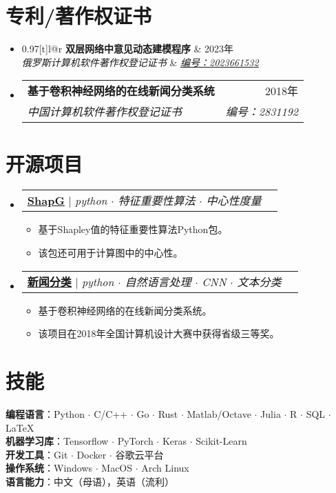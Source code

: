 \documentclass[letterpaper,10pt]{ctexart}
\makeatletter
\newcommand{\link}[2]{\href{#1}{\color{blue}\underline{#2}}}
\newcommand{\resumeItem}[1]{
  \item\small{
    {#1 \vspace{-2pt}}
  }
}
\newcommand{\resumeSubheading}[4]{
  \vspace{-2pt}\item
  \begin{tabular*}{0.97\textwidth}[t]{l@{\extracolsep{\fill}}r}
    \textbf{#1} & #2 \\
    \textit{\small#3} & \textit{\small #4} \\
  \end{tabular*}\vspace{-7pt}
}
\newcommand{\resumeProjectHeading}[2]{
  \item
  \begin{tabular*}{0.97\textwidth}{l@{\extracolsep{\fill}}r}
    \small#1 & #2 \\
  \end{tabular*}\vspace{-7pt}
}
\newenvironment{resumeSubHeadingList}{\begin{itemize}[leftmargin=0.15in, label={}]}{\end{itemize}}
\newenvironment{resumeItemList}{\begin{itemize}}{\end{itemize}}
\makeatother
\begin{document}
\newpage
\section{专利/著作权证书}
\begin{resumeSubHeadingList}
  \resumeSubheading
    {双层网络中意见动态建模程序}{2023年}
    {俄罗斯计算机软件著作权登记证书}{{\link{https://new.fips.ru/registers-doc-view/fips_servlet?DB=EVM&DocNumber=2023661532&TypeFile=html}{编号：2023661532}}}

  \resumeSubheading
    {基于卷积神经网络的在线新闻分类系统}{2018年}
    {中国计算机软件著作权登记证书}{编号：2831192}
\end{resumeSubHeadingList}

\section{开源项目}
\begin{resumeSubHeadingList}

  \resumeProjectHeading{
    \link{https://github.com/vectorsss/shapG}{\textbf{ShapG}} $|$
    \emph{python $\cdot$ 特征重要性算法 $\cdot$ 中心性度量}}{}
  \begin{resumeItemList}
    \resumeItem{基于Shapley值的特征重要性算法Python包。}
    \resumeItem{该包还可用于计算图中的中心性。}
  \end{resumeItemList}

  \resumeProjectHeading{
    \link{https://github.com/vectorsss/news_classification}{\textbf{新闻分类}} $|$
    \emph{python $\cdot$ 自然语言处理 $\cdot$ CNN $\cdot$ 文本分类}}{}
  \begin{resumeItemList}
    \resumeItem{基于卷积神经网络的在线新闻分类系统。}
    \resumeItem{该项目在2018年全国计算机设计大赛中获得省级三等奖。}
  \end{resumeItemList}
\end{resumeSubHeadingList}

\section{技能}
\begin{itemize}[leftmargin=0.15in, label={}]
  \small{\item{
        \textbf{编程语言}{：Python $\cdot$ C/C++ $\cdot$ Go $\cdot$ Rust $\cdot$ Matlab/Octave $\cdot$ Julia $\cdot$ R $\cdot$ SQL $\cdot$ \LaTeX} \\
        \textbf{机器学习库}{：Tensorflow $\cdot$  PyTorch $\cdot$ Keras $\cdot$  Scikit-Learn} \\
        \textbf{开发工具}{：Git $\cdot$ Docker $\cdot$  谷歌云平台} \\
        \textbf{操作系统}{：Windows $\cdot$ MacOS $\cdot$ Arch Linux} \\
        \textbf{语言能力}{：中文（母语），英语（流利）}
        }}
\end{itemize}
\end{document}
